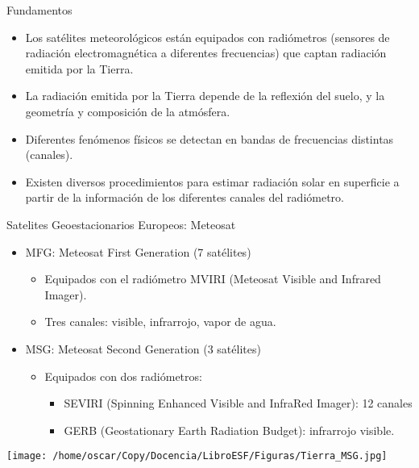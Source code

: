 \documentclass[xcolor={usenames,svgnames,dvipsnames}]{beamer}
\begin{document}
\begin{frame}[label=sec-3-1]{Fundamentos}
\begin{itemize}
\item Los satélites meteorológicos están equipados con \alert{radiómetros}
(sensores de radiación electromagnética a diferentes frecuencias)
que captan \alert{radiación emitida por la Tierra}.

\item La radiación emitida por la Tierra depende de la \alert{reflexión del
suelo}, y la \alert{geometría y composición de la atmósfera}.

\item Diferentes fenómenos físicos se detectan en \alert{bandas de frecuencias}
distintas (canales).

\item Existen diversos procedimientos para \alert{estimar radiación solar} en
superficie a partir de la información de los diferentes canales del
radiómetro.
\end{itemize}
\end{frame}
\begin{frame}[label=sec-3-2]{Satelites Geoestacionarios Europeos: Meteosat}
\begin{itemize}
\item \alert{MFG}: Meteosat First Generation (7 satélites)
\begin{itemize}
\item Equipados con el radiómetro MVIRI (Meteosat Visible and Infrared Imager).
\item Tres canales: visible, infrarrojo, vapor de agua.
\end{itemize}
\item \alert{MSG}: Meteosat Second Generation (3 satélites)
\begin{itemize}
\item Equipados con dos radiómetros:
\begin{itemize}
\item \alert{SEVIRI} (Spinning Enhanced Visible and InfraRed Imager): 12 canales
\item GERB (Geostationary Earth Radiation Budget): infrarrojo visible.
\end{itemize}
\end{itemize}
\end{itemize}

\begin{center}
\texttt{[image: /home/oscar/Copy/Docencia/LibroESF/Figuras/Tierra\_MSG.jpg]}
\end{center}
\end{frame}
\end{document}
